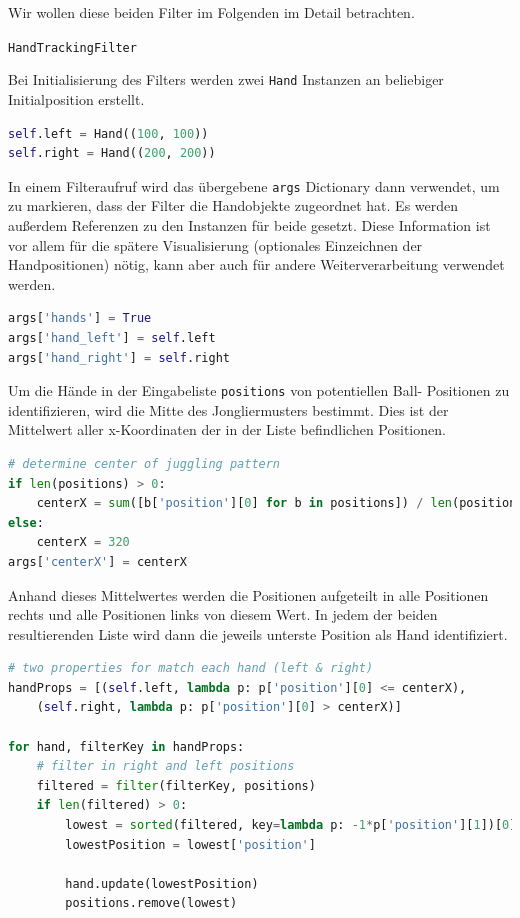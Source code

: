 \documentclass[12pt,a4paper,ngerman]{scrartcl}
\begin{document}
Wir wollen diese beiden Filter im Folgenden im Detail betrachten.

\lstinline{HandTrackingFilter}

Bei Initialisierung des Filters werden zwei \lstinline{Hand} Instanzen an beliebiger Initialposition erstellt.

\begin{lstlisting}[language=Python,caption={\lstinline{HandTracking.py}, Ausschnitt}]
self.left = Hand((100, 100))
self.right = Hand((200, 200))
\end{lstlisting}

In einem Filteraufruf wird das übergebene \lstinline{args} Dictionary dann
verwendet, um zu markieren, dass der Filter die Handobjekte zugeordnet hat. Es
werden außerdem Referenzen zu den Instanzen für beide gesetzt. Diese Information ist
vor allem für die spätere Visualisierung (optionales Einzeichnen der Handpositionen)
nötig, kann aber auch für andere Weiterverarbeitung verwendet werden.

\begin{lstlisting}[language=Python,caption={\lstinline{HandTracking.py}, Ausschnitt}]
args['hands'] = True
args['hand_left'] = self.left
args['hand_right'] = self.right
\end{lstlisting}

Um die Hände in der Eingabeliste \lstinline{positions} von potentiellen Ball-
Positionen zu identifizieren, wird
die Mitte des Jongliermusters bestimmt. Dies ist der Mittelwert aller x-Koordinaten
der in der Liste befindlichen Positionen.

\begin{lstlisting}[language=Python,caption={\lstinline{HandTracking.py}, Ausschnitt}]
# determine center of juggling pattern
if len(positions) > 0:
    centerX = sum([b['position'][0] for b in positions]) / len(positions)
else:
    centerX = 320
args['centerX'] = centerX
\end{lstlisting}

Anhand dieses Mittelwertes werden die Positionen aufgeteilt in alle Positionen
rechts und alle Positionen links von diesem Wert. In jedem der beiden resultierenden
Liste wird dann die jeweils unterste Position als Hand identifiziert.

\begin{lstlisting}[language=Python,caption={\lstinline{HandTracking.py}, Ausschnitt}]
# two properties for match each hand (left & right)
handProps = [(self.left, lambda p: p['position'][0] <= centerX),
    (self.right, lambda p: p['position'][0] > centerX)]

for hand, filterKey in handProps:
    # filter in right and left positions
    filtered = filter(filterKey, positions)
    if len(filtered) > 0:
        lowest = sorted(filtered, key=lambda p: -1*p['position'][1])[0]
        lowestPosition = lowest['position']

        hand.update(lowestPosition)
        positions.remove(lowest)
\end{lstlisting}
\end{document}
